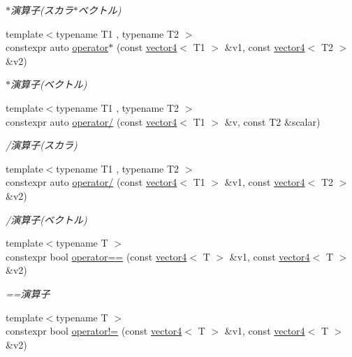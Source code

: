 \begin{DoxyCompactItemize}
\begin{DoxyCompactList}\small\item\em $\ast$演算子(スカラ$\ast$ベクトル) \end{DoxyCompactList}\item 
{\footnotesize template$<$typename T1 , typename T2 $>$ }\\constexpr auto \mbox{\hyperlink{namespacesaki_a19656e376d8720e2a67f3d08082770b0}{operator$\ast$}} (const \mbox{\hyperlink{classsaki_1_1vector4}{vector4}}$<$ T1 $>$ \&v1, const \mbox{\hyperlink{classsaki_1_1vector4}{vector4}}$<$ T2 $>$ \&v2)
\begin{DoxyCompactList}\small\item\em $\ast$演算子(ベクトル) \end{DoxyCompactList}\item 
{\footnotesize template$<$typename T1 , typename T2 $>$ }\\constexpr auto \mbox{\hyperlink{namespacesaki_a5525c6da34ded0620ee6d965e687bedc}{operator/}} (const \mbox{\hyperlink{classsaki_1_1vector4}{vector4}}$<$ T1 $>$ \&v, const T2 \&scalar)
\begin{DoxyCompactList}\small\item\em /演算子(スカラ) \end{DoxyCompactList}\item 
{\footnotesize template$<$typename T1 , typename T2 $>$ }\\constexpr auto \mbox{\hyperlink{namespacesaki_ac72c945dc5e1e8fe6065beac4a310a54}{operator/}} (const \mbox{\hyperlink{classsaki_1_1vector4}{vector4}}$<$ T1 $>$ \&v1, const \mbox{\hyperlink{classsaki_1_1vector4}{vector4}}$<$ T2 $>$ \&v2)
\begin{DoxyCompactList}\small\item\em /演算子(ベクトル) \end{DoxyCompactList}\item 
{\footnotesize template$<$typename T $>$ }\\constexpr bool \mbox{\hyperlink{namespacesaki_abe77ceb7257097320a66f9f182d11111}{operator==}} (const \mbox{\hyperlink{classsaki_1_1vector4}{vector4}}$<$ T $>$ \&v1, const \mbox{\hyperlink{classsaki_1_1vector4}{vector4}}$<$ T $>$ \&v2)
\begin{DoxyCompactList}\small\item\em ==演算子 \end{DoxyCompactList}\item 
{\footnotesize template$<$typename T $>$ }\\constexpr bool \mbox{\hyperlink{namespacesaki_a6805502ef12cd12f6be61a958fd35aa7}{operator!=}} (const \mbox{\hyperlink{classsaki_1_1vector4}{vector4}}$<$ T $>$ \&v1, const \mbox{\hyperlink{classsaki_1_1vector4}{vector4}}$<$ T $>$ \&v2)

\end{DoxyCompactItemize}
